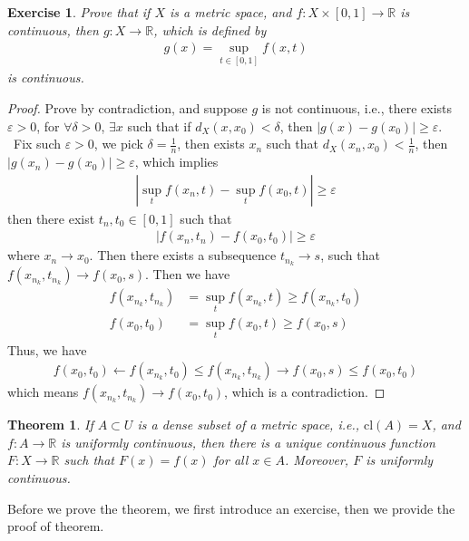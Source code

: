 \documentclass[12pt,leqno]{amsart}
\newtheorem{theorem}{Theorem}[section]
\newtheorem{exercise}{Exercise}[section]
\theoremstyle{definition}
\numberwithin{equation}{subsection}
\begin{document}
\begin{exercise}
Prove that if $X$ is a metric space, and $f:X\times[0,1]\to\mathbb{R}$ is continuous, then $g:X\to\mathbb{R}$, which is defined by 
\begin{align*}
    g(x) = \sup_{t\in[0,1]}f(x,t)
\end{align*}
is continuous.
\end{exercise}
\begin{proof}
Prove by contradiction, and suppose $g$ is not continuous, i.e., there exists $\varepsilon > 0$, for $\forall \delta > 0$, $\exists x$ such that if $d_X(x,x_0) < \delta$, then $|g(x) - g(x_0)|\geq\varepsilon$. \\
\hspace*{1em}\, Fix such $\varepsilon > 0$, we pick $\delta = \frac{1}{n}$, then exists $x_n$ such that $d_X(x_n,x_0) < \frac{1}{n}$, then $|g(x_n) - g(x_0)| \geq \varepsilon$, which implies
\begin{align*}
    \left|\sup_t f(x_n,t) - \sup_t f(x_0,t)\right| \geq \varepsilon
\end{align*}
then there exist $t_n, t_0\in[0,1]$ such that 
\begin{align*}
    \left|f(x_n,t_n) - f(x_0,t_0)\right| \geq \varepsilon
\end{align*}
where $x_n\to x_0$. Then there exists a subsequence $t_{n_k}\to s$, such that $f(x_{n_k},t_{n_k})\to f(x_0,s)$. Then we have 
\begin{align*}
    f(x_{n_k},t_{n_k}) & = \sup_t f(x_{n_k},t) \geq f(x_{n_k},t_0) \\
    f(x_0,t_0) & = \sup_t f(x_0,t) \geq f(x_0,s) 
\end{align*}
Thus, we have 
\begin{align*}
    f(x_0,t_0) \leftarrow f(x_{n_k},t_0) \leq f(x_{n_k},t_{n_k}) \rightarrow f(x_0,s) \leq f(x_0,t_0)
\end{align*}
which means $f(x_{n_k},t_{n_k})\to f(x_0,t_0)$, which is a contradiction.
\end{proof}

\begin{theorem}
If $A\subset U$ is a dense subset of a metric space, i.e., $\text{cl}(A) = X$, and $f:A\to\mathbb{R}$ is uniformly continuous, then there is a unique continuous function $F:X\to\mathbb{R}$ such that $F(x) = f(x)$ for all $x\in A$. Moreover, $F$ is uniformly continuous.
\end{theorem}

Before we prove the theorem, we first introduce an exercise, then we provide the proof of theorem.
\end{document}
